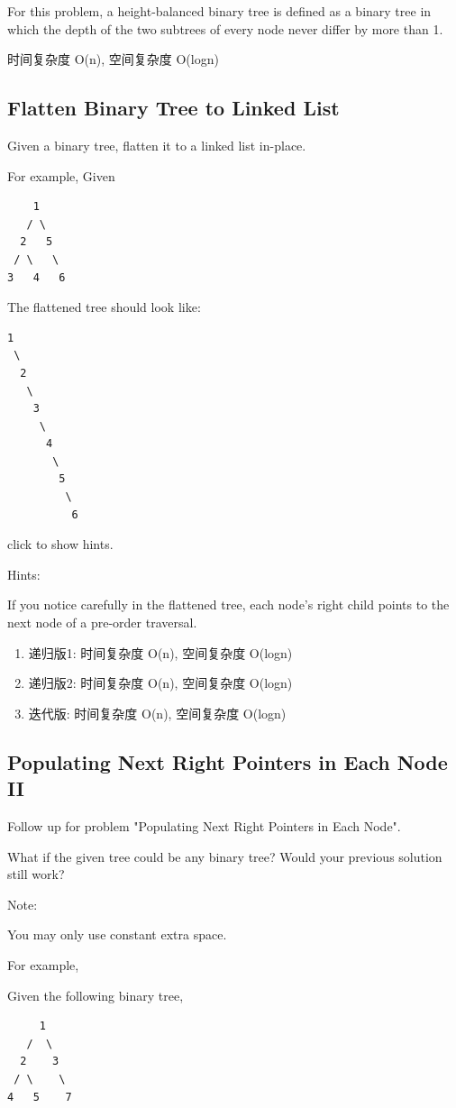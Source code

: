 \documentclass[12pt]{book}
\begin{document}
For this problem, a height-balanced binary tree is defined as a binary tree in which the depth of the two subtrees of every node never differ by more than 1.

时间复杂度 O(n), 空间复杂度 O(logn)

\subsection{Flatten Binary Tree to Linked List}
\label{sec-4-1-11}
Given a binary tree, flatten it to a linked list in-place.

For example, Given
\lstset{language=java,label= ,caption= ,numbers=none}
\begin{lstlisting}
    1
   / \
  2   5
 / \   \
3   4   6
\end{lstlisting}

The flattened tree should look like:
\lstset{language=java,label= ,caption= ,numbers=none}
\begin{lstlisting}
1
 \
  2
   \
    3
     \
      4
       \
        5
         \
          6
\end{lstlisting}
click to show hints.

Hints:

If you notice carefully in the flattened tree, each node's right child points to the next node of a pre-order traversal.
\begin{enumerate}
\item 递归版1: 时间复杂度 O(n), 空间复杂度 O(logn)
\label{sec-4-1-11-1}
\item 递归版2: 时间复杂度 O(n), 空间复杂度 O(logn)
\label{sec-4-1-11-2}
\item 迭代版: 时间复杂度 O(n), 空间复杂度 O(logn)
\label{sec-4-1-11-3}
\end{enumerate}


\subsection{Populating Next Right Pointers in Each Node II}
\label{sec-4-1-12}
Follow up for problem "Populating Next Right Pointers in Each Node".

What if the given tree could be any binary tree? Would your previous solution still work?

Note:

You may only use constant extra space.

For example,

Given the following binary tree,
\lstset{language=java,label= ,caption= ,numbers=none}
\begin{lstlisting}
     1
   /  \
  2    3
 / \    \
4   5    7
\end{lstlisting}
\end{document}

